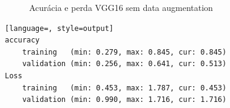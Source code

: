 \begin{figure}[h!]
\centering
\hspace*{-2cm} %
\caption{Acurácia e perda VGG16 sem data augmentation}
\end{figure}

\begin{lstlisting}[language=, style=output]
accuracy
	training   (min: 0.279, max: 0.845, cur: 0.845)
	validation (min: 0.256, max: 0.641, cur: 0.513)
Loss
	training   (min: 0.453, max: 1.787, cur: 0.453)
	validation (min: 0.990, max: 1.716, cur: 1.716)
\end{lstlisting}


